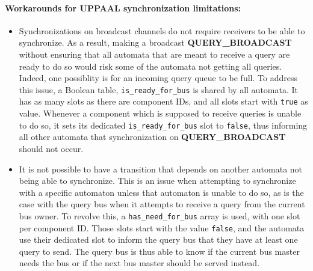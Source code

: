 \paragraph{Workarounds for UPPAAL synchronization limitations:}
\begin{itemize}
\item
   Synchronizations on broadcast channels do not require receivers to be able to
   synchronize. As a result, making a broadcast \textbf{QUERY\_BROADCAST}
   without ensuring that all automata that are meant to receive a query are
   ready to do so would risk some of the automata not getting all queries.
   Indeed, one possiblity is for an incoming query queue to be full. To address
   this issue, a Boolean table, \lstinline!is_ready_for_bus! is shared by
   all automata. It has as many slots as there are component IDs, and all slots
   start with \lstinline!true! as value. Whenever a component which is supposed
   to receive queries is unable to do so, it sets its dedicated
   \lstinline!is_ready_for_bus! slot to \lstinline!false!, thus informing all
   other automata that synchronization on \textbf{QUERY\_BROADCAST} should not
   occur.
\item
   It is not possible to have a transition that depends on another automata not
   being able to synchronize. This is an issue when attempting to synchronize
   with a specific automaton unless that automaton is unable to do so, as is the
   case with the query bus when it attempts to receive a query from the current
   bus owner. To revolve this, a \lstinline!has_need_for_bus! array is used,
   with one slot per component ID. Those slots start with the value
   \lstinline!false!, and the automata use their dedicated slot to inform the
   query bus that they have at least one query to send. The query bus is thus
   able to know if the current bus master needs the bus or if the next bus
   master should be served instead.
\end{itemize}
